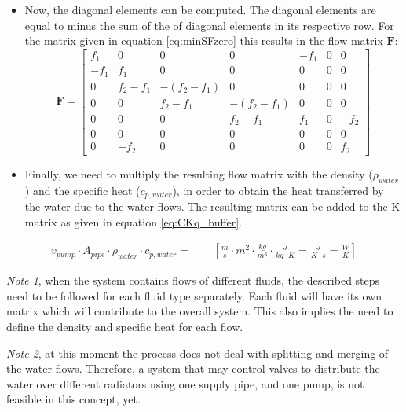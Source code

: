 \begin{itemize}
\item Now, the diagonal elements can be computed. The diagonal elements are equal to minus the sum of the of diagonal elements in its respective row. For the matrix given in equation \ref{eq:minSFzero} this results in the flow matrix $\mathbf{F}$:
\begin{equation}
		\mathbf{F} =  \begin{bmatrix}
							f_1   & 0      & 0       & 0       & -f_1    & 0 & 0 \\
							-f_1& f_1      & 0		   & 0       & 0       & 0 & 0 \\
							0   & f_2-f_1& -(f_2-f_1)       & 0			 & 0       & 0 & 0 \\
							0   & 0      & f_2-f_1 & -(f_2-f_1)       & 0			 & 0 & 0 \\
							0	  & 0      & 0       & f_2-f_1 & f_1      & 0 & -f_2 \\
							0   & 0      & 0       & 0       & 0       & 0 & 0 \\
							0   & -f_2   & 0       & 0       & 0       & 0 & f_2 
							\end{bmatrix}
	\label{eq:flowmatrix}
	\end{equation}

\item Finally, we need to multiply the resulting flow matrix with the density ($\rho_{water}$) and the specific heat ($c_{p, water}$), in order to obtain the heat transferred by the water due to the water flows. The resulting matrix can be added to the K matrix as given in equation \ref{eq:CKq_buffer}.
\end{itemize} 

\begin{equation}
	\begin{aligned}
		v_{pump} \cdot A_{pipe} \cdot \rho_{water} \cdot c_{p, water} =  \qquad \left[ \frac{m}{s} \cdot m^2 \cdot\frac{kg}{m^3} \cdot \frac{J}{kg \cdot K} = \frac{J}{K \cdot s} = \frac{W}{K}\right]
	\end{aligned}
\end{equation}

\emph{Note 1}, when the system contains flows of different fluids, the described steps need to be followed for each fluid type separately. Each fluid will have its own matrix which will contribute to the overall system. This also implies the need to define the density and specific heat for each flow.

\emph{Note 2}, at this moment the process does not deal with splitting and merging of the water flows. Therefore, a system that may control valves to distribute the water over different radiators using one supply pipe, and one pump, is not feasible in this concept, yet.   


